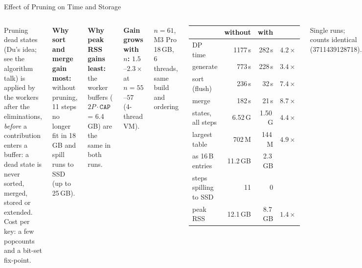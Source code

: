 \documentclass[aspectratio=169,t]{beamer}
\begin{document}
\begin{frame}{Effect of Pruning on Time and Storage}
\footnotesize
\begin{columns}[t]
Pruning dead states (Du's idea; see the algorithm talk) is applied by the
workers after the eliminations, \emph{before} a contribution enters a
buffer: a dead state is never sorted, merged, stored or extended.
Cost per key: a few popcounts and a bit-set fix-point.

\vspace{0.15cm}
\textbf{Why sort and merge gain most:} without pruning, 11 steps no longer
fit in 18\,GB and spill runs to SSD (up to 25\,GB).

\vspace{0.1cm}
\textbf{Why peak RSS gains least:} the worker buffers
($2P\cdot\texttt{CAP}$ = 6.4\,GB) are the same in both runs.

\vspace{0.1cm}
\textbf{Gain grows with $n$:} $1.5$--$2.3\times$ at $n=55$--$57$ (4-thread VM).

\textbf{$n=61$}, M3 Pro 18\,GB, 6 threads, same build and ordering

\vspace{0.05cm}
\begin{center}
\begin{tabular}{lrrr}
\toprule
 & without & with & \\
\midrule
\rowcolor{dkgreen!15}
DP time & 1177\,s & 282\,s & $4.2\times$\\
\quad generate & 773\,s & 228\,s & $3.4\times$\\
\quad sort (flush) & 236\,s & 32\,s & $7.4\times$\\
\quad merge & 182\,s & 21\,s & $8.7\times$\\
\midrule
states, all steps & 6.52\,G & 1.50\,G & $4.4\times$\\
largest table & 702\,M & 144\,M & $4.9\times$\\
\quad as 16\,B entries & 11.2\,GB & 2.3\,GB & \\
steps spilling to SSD & 11 & 0 & \\
peak RSS & 12.1\,GB & 8.7\,GB & $1.4\times$\\
\bottomrule
\end{tabular}
\end{center}
Single runs; counts identical (3711439128718).
\end{columns}
\end{frame}
\end{document}
